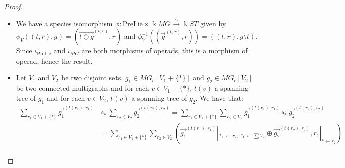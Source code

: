 \documentclass[a4paper]{article}
\theoremstyle{definition}
\begin{document}
\begin{proof}
\begin{itemize}
\item We have a species isomorphism $\phi:\text{PreLie}\times\Bbbk MG\stackrel{\sim}\longrightarrow\Bbbk ST$ given by $\phi_V((t,r),g) = (\overrightarrow{t\oplus g}^{(t,r)},r)$ and $\phi_V^{-1}((\overrightarrow{g}^{(t,r)},r)) = ((t,r),g\setminus t)$. Since $\iota_{\text{PreLie}}$ and $\iota_{MG}$ are both morphisms of operads, this is a morphism of operad, hence the result.
\item Let $V_1$ and $V_2$ be two disjoint sets, $g_1\in MG_c[V_1+\{\ast\}]$ and $g_2\in MG_c[V_2]$ be two connected multigraphs and for each $v\in V_1+\{\ast\}$, $t(v)$ a spanning tree of $g_1$ and for each $v\in V_2$, $t(v)$ a spanning tree of $g_2$. We have that:
\begin{align*}
\sum_{r_1\in V_1+\{\ast\}} \overrightarrow{g_1}^{(t(r_1),r_1)} &\circ_{\ast} \sum_{r_2\in V_2} \overrightarrow{g_2}^{(t(r_2),r_2)} = \sum_{r_1\in V_1+\{\ast\}}\sum_{r_2\in V_2} \overrightarrow{g_1}^{(t(r_1),r_1)}\circ_{\ast} \overrightarrow{g_2}^{(t(r_2),r_2)} \\
&= \sum_{r_1\in V_1+\{\ast\}}\sum_{r_2\in V_2} \left(\overrightarrow{g_1}^{(t(r_1),r_1)}|_{\ast_s\leftarrow r_2,\, \ast_t\leftarrow\sum V_2}\oplus \overrightarrow{g_2}^{(t(r_2),r_2)}, r_1|_{\ast\leftarrow r_2}\right)\\


\end{align*}
\end{itemize}
\end{proof}
\end{document}
